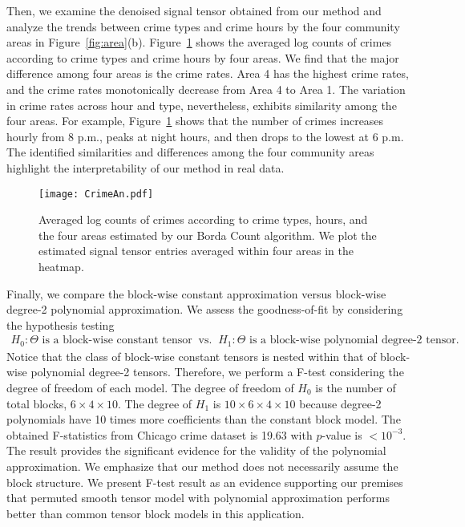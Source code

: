 \documentclass{article}
\theoremstyle{definition}
\begin{document}
Then, we examine the denoised signal tensor obtained from our method and analyze the trends between crime types and crime hours by the four community areas in Figure~\ref{fig:area}(b). Figure~\ref{fig:crimeA} shows the averaged log counts of crimes according to crime types and crime hours by four areas. We find that the major difference among four areas is the crime rates. Area 4 has the highest crime rates,  and the crime rates monotonically decrease from Area 4 to Area 1. The variation in crime rates across hour and type, nevertheless, exhibits similarity among the four areas. For example, Figure~\ref{fig:crimeA} shows that the number of crimes increases hourly from 8 p.m., peaks at night hours, and then drops to the lowest at 6 p.m. 
The identified similarities and differences among the four community areas highlight the interpretability of our method in real data.
\begin{figure}[h]
    \centering
    \texttt{[image: CrimeAn.pdf]}
    \caption{Averaged log counts of crimes according to crime types, hours, and the four areas estimated by our Borda Count algorithm. We plot the estimated signal tensor entries averaged within four areas in the heatmap.}
    \label{fig:crimeA}
    \vspace{-.4cm}
\end{figure}

Finally, we compare the block-wise constant approximation versus block-wise degree-2 polynomial approximation. We assess the goodness-of-fit by considering the hypothesis testing
\begin{align}
    H_0 \colon \Theta \text{ is a block-wise constant tensor} \ \text{ vs. } \ H_1\colon \Theta \text{ is a block-wise polynomial degree-2 tensor}.
\end{align}
Notice that the class of block-wise constant tensors is nested within that of block-wise polynomial degree-2 tensors. Therefore, we perform a F-test considering the degree of freedom of each model. The degree of freedom of $H_0$ is the number of total blocks, $6\times 4\times 10$. The degree of $H_1$ is $10\times6\times 4\times 10$ because degree-2 polynomials have 10 times more coefficients than the constant block model. The obtained F-statistics from Chicago crime dataset is 19.63 with $p$-value is $<10^{-3}$. The result provides the significant evidence for the validity of the polynomial approximation. 
We emphasize that our method does not necessarily assume the block structure. We present F-test result as an evidence supporting our premises that permuted smooth tensor model with polynomial approximation performs better than common tensor block models in this application. 
\end{document}
